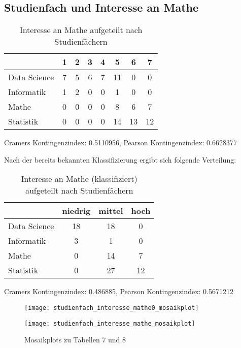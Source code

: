 \documentclass[paper=a4,                 %
               fontsize=12pt,            %
               parskip=half,             %
               ngerman,                 %
               ]{scrartcl}
\begin{document}
\subsection{Studienfach und Interesse an Mathe}
\begin{table}[h]
\begin{center}
\begin{tabular}{l||c|c|c|c|c|c|c}
& 1 & 2 & 3 & 4 & 5 & 6 & 7 \\
\hline
Data Science & 7 & 5 & 6 & 7 &11 & 0 & 0\\
Informatik  &  1 & 2 & 0 & 0 & 1&  0&  0\\
Mathe     &    0 & 0 & 0 & 0 & 8 & 6 & 7\\
Statistik     &0  &0 & 0 & 0 &14 &13& 12\\
\end{tabular}
\caption{Interesse an Mathe aufgeteilt nach Studienfächern}
Cramers Kontingenzindex:  0.5110956, Pearson Kontingenzindex:  0.6628377
\end{center}
\end{table}
Nach der bereits bekannten Klassifizierung ergibt sich folgende Verteilung:
\begin{table}[h]
\begin{center}
\begin{tabular}{l||c|c|c}
& niedrig & mittel & hoch \\
\hline
Data Science & 18 & 18 & 0\\
Informatik  & 3 & 1 & 0 \\
Mathe     &  0 & 14 & 7  \\
Statistik     &0 & 27 & 12\\
\end{tabular}
\caption{Interesse an Mathe (klassifiziert) aufgeteilt nach Studienfächern}
Cramers Kontingenzindex:  0.486885, Pearson Kontingenzindex:  0.5671212 
\end{center}
\end{table}

\begin{figure}[ht]
   \begin{minipage}{.4\textwidth}
      \texttt{[image: studienfach\_interesse\_mathe0\_mosaikplot]}
   \end{minipage}
   \hspace{.1\linewidth}%
   \begin{minipage}{.4\textwidth} %
	\texttt{[image: studienfach\_interesse\_mathe\_mosaikplot]}
   \end{minipage}
   \caption{Mosaikplots zu Tabellen 7 und 8}
\end{figure}
\end{document}

